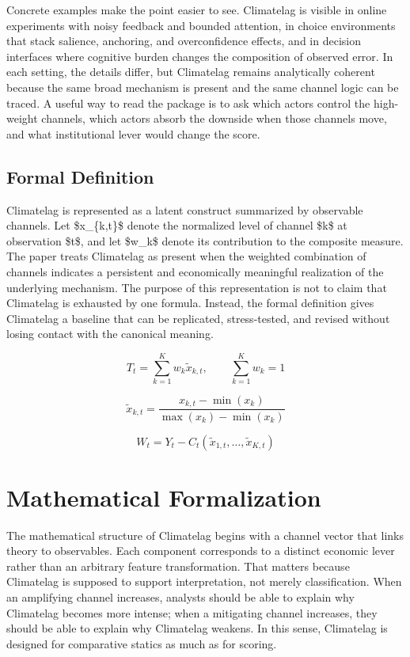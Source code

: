\documentclass[12pt]{article}
\begin{document}
Concrete examples make the point easier to see. Climatelag is visible in online experiments with noisy feedback and bounded attention, in choice environments that stack salience, anchoring, and overconfidence effects, and in decision interfaces where cognitive burden changes the composition of observed error. In each setting, the details differ, but Climatelag remains analytically coherent because the same broad mechanism is present and the same channel logic can be traced. A useful way to read the package is to ask which actors control the high-weight channels, which actors absorb the downside when those channels move, and what institutional lever would change the score.

\subsection{Formal Definition}
Climatelag is represented as a latent construct summarized by observable channels. Let \$x\_\{k,t\}\$ denote the normalized level of channel \$k\$ at observation \$t\$, and let \$w\_k\$ denote its contribution to the composite measure. The paper treats Climatelag as present when the weighted combination of channels indicates a persistent and economically meaningful realization of the underlying mechanism. The purpose of this representation is not to claim that Climatelag is exhausted by one formula. Instead, the formal definition gives Climatelag a baseline that can be replicated, stress-tested, and revised without losing contact with the canonical meaning.

\begin{equation}
T_t = \sum_{k=1}^K w_k \tilde{x}_{k,t}, \qquad \sum_{k=1}^K w_k = 1
\label{eq:index}
\end{equation}

\begin{equation}
\tilde{x}_{k,t} = \frac{x_{k,t} - \min(x_k)}{\max(x_k) - \min(x_k)}
\label{eq:norm}
\end{equation}

\begin{equation}
W_t = Y_t - C_t(\tilde{x}_{1,t}, \dots, \tilde{x}_{K,t})
\label{eq:welfare}
\end{equation}

\section{Mathematical Formalization}
The mathematical structure of Climatelag begins with a channel vector that links theory to observables. Each component corresponds to a distinct economic lever rather than an arbitrary feature transformation. That matters because Climatelag is supposed to support interpretation, not merely classification. When an amplifying channel increases, analysts should be able to explain why Climatelag becomes more intense; when a mitigating channel increases, they should be able to explain why Climatelag weakens. In this sense, Climatelag is designed for comparative statics as much as for scoring.
\end{document}
